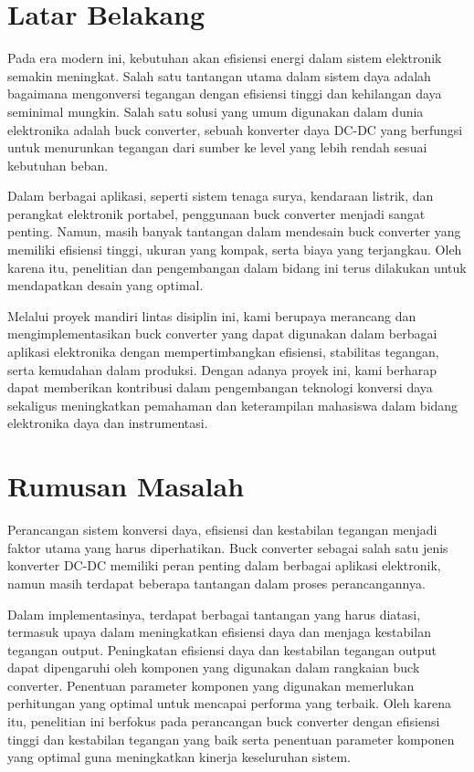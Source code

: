 \renewcommand{\thesection}{\Roman{section}}

\section{Latar Belakang}

Pada era modern ini, kebutuhan akan efisiensi energi dalam sistem elektronik semakin meningkat. Salah satu tantangan utama dalam sistem daya adalah bagaimana mengonversi tegangan dengan efisiensi tinggi dan kehilangan daya seminimal mungkin. Salah satu solusi yang umum digunakan dalam dunia elektronika adalah buck converter, sebuah konverter daya DC-DC yang berfungsi untuk menurunkan tegangan dari sumber ke level yang lebih rendah sesuai kebutuhan beban.

Dalam berbagai aplikasi, seperti sistem tenaga surya, kendaraan listrik, dan perangkat elektronik portabel, penggunaan buck converter menjadi sangat penting. Namun, masih banyak tantangan dalam mendesain buck converter yang memiliki efisiensi tinggi, ukuran yang kompak, serta biaya yang terjangkau. Oleh karena itu, penelitian dan pengembangan dalam bidang ini terus dilakukan untuk mendapatkan desain yang optimal.

Melalui proyek mandiri lintas disiplin ini, kami berupaya merancang dan mengimplementasikan buck converter yang dapat digunakan dalam berbagai aplikasi elektronika dengan mempertimbangkan efisiensi, stabilitas tegangan, serta kemudahan dalam produksi. Dengan adanya proyek ini, kami berharap dapat memberikan kontribusi dalam pengembangan teknologi konversi daya sekaligus meningkatkan pemahaman dan keterampilan mahasiswa dalam bidang elektronika daya dan instrumentasi.

\section{Rumusan Masalah}
Perancangan sistem konversi daya, efisiensi dan kestabilan tegangan menjadi faktor utama yang harus diperhatikan. Buck converter sebagai salah satu jenis konverter DC-DC memiliki peran penting dalam berbagai aplikasi elektronik, namun masih terdapat beberapa tantangan dalam proses perancangannya.

Dalam implementasinya, terdapat berbagai tantangan yang harus diatasi, termasuk upaya dalam meningkatkan efisiensi daya dan menjaga kestabilan tegangan output. Peningkatan efisiensi daya dan kestabilan tegangan output dapat dipengaruhi oleh komponen yang digunakan dalam rangkaian buck converter. Penentuan parameter komponen yang digunakan memerlukan perhitungan yang optimal untuk mencapai performa yang terbaik.  Oleh karena itu, penelitian ini berfokus pada perancangan buck converter dengan efisiensi tinggi dan kestabilan tegangan yang baik serta penentuan parameter komponen yang optimal guna meningkatkan kinerja keseluruhan sistem.


